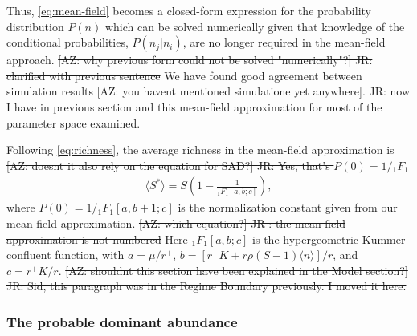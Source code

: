 \documentclass[9pt,twocolumn,twoside,lineno]{pnas-new}
\begin{document}
Thus, \eqref{eq:mean-field} becomes a closed-form expression for the probability distribution $P(n)$ which can be solved numerically given that knowledge of the conditional probabilities, $P(n_j|n_i)$, are no longer required in the mean-field approach. \st{[AZ: why previous form could not be solved "numerically"?] JR: clarified with previous sentence}
We have found good agreement between simulation results \st{[AZ: you havent mentioned simulatione yet anywhere]. JR: now I have in previous section} and this mean-field approximation for most of the parameter space examined. 

Following \eqref{eq:richness}, the average richness in the mean-field approximation is \st{[AZ: doesnt it also rely on the equation for SAD?] JR: Yes, that's $P(0) = 1/{}_1F_1$}
\begin{eqnarray}
\langle S^*\rangle = S \left( 1 - \frac{1}{{_1}F_1[a,b;c]}\right ) , 
\label{eq:mf-richness}
\end{eqnarray}
where $P(0)=1/{_1F_1}[a,b+1;c]$ is the normalization constant given from our mean-field approximation. \st{[AZ: which equation?] JR : the mean field approximation is not numbered}
Here ${_1F_1}[a,b;c] $ is the hypergeometric Kummer confluent function, with $a=\mu/r^+$, ${b}= %
[r^-K+r\rho (S-1)\langle n\rangle  ]/r$, and ${c}=%
{r^+ K}/{r}$. \st{[AZ: shouldnt this section have been explained in the Model section?] JR: Sid, this paragraph was in the Regime Boundary previously. I moved it here.}

\subsubsection{The probable dominant abundance}
\end{document}

